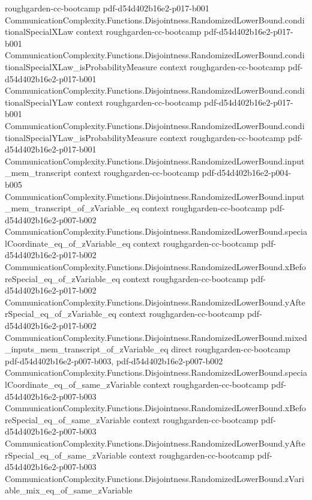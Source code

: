 \begin{theorem}
  {roughgarden-cc-bootcamp}
  {pdf-d54d402b16e2-p017-b001}
\proofstep
  {CommunicationComplexity.Functions.Disjointness.RandomizedLowerBound.conditionalSpecialXLaw}
  {context}
  {roughgarden-cc-bootcamp}
  {pdf-d54d402b16e2-p017-b001}
\proofstep
  {CommunicationComplexity.Functions.Disjointness.RandomizedLowerBound.conditionalSpecialXLaw_isProbabilityMeasure}
  {context}
  {roughgarden-cc-bootcamp}
  {pdf-d54d402b16e2-p017-b001}
\proofstep
  {CommunicationComplexity.Functions.Disjointness.RandomizedLowerBound.conditionalSpecialYLaw}
  {context}
  {roughgarden-cc-bootcamp}
  {pdf-d54d402b16e2-p017-b001}
\proofstep
  {CommunicationComplexity.Functions.Disjointness.RandomizedLowerBound.conditionalSpecialYLaw_isProbabilityMeasure}
  {context}
  {roughgarden-cc-bootcamp}
  {pdf-d54d402b16e2-p017-b001}
\proofstep
  {CommunicationComplexity.Functions.Disjointness.RandomizedLowerBound.input_mem_transcript}
  {context}
  {roughgarden-cc-bootcamp}
  {pdf-d54d402b16e2-p004-b005}
\proofstep
  {CommunicationComplexity.Functions.Disjointness.RandomizedLowerBound.input_mem_transcript_of_zVariable_eq}
  {context}
  {roughgarden-cc-bootcamp}
  {pdf-d54d402b16e2-p007-b002}
\proofstep
  {CommunicationComplexity.Functions.Disjointness.RandomizedLowerBound.specialCoordinate_eq_of_zVariable_eq}
  {context}
  {roughgarden-cc-bootcamp}
  {pdf-d54d402b16e2-p017-b002}
\proofstep
  {CommunicationComplexity.Functions.Disjointness.RandomizedLowerBound.xBeforeSpecial_eq_of_zVariable_eq}
  {context}
  {roughgarden-cc-bootcamp}
  {pdf-d54d402b16e2-p017-b002}
\proofstep
  {CommunicationComplexity.Functions.Disjointness.RandomizedLowerBound.yAfterSpecial_eq_of_zVariable_eq}
  {context}
  {roughgarden-cc-bootcamp}
  {pdf-d54d402b16e2-p017-b002}
\proofstep
  {CommunicationComplexity.Functions.Disjointness.RandomizedLowerBound.mixed_inputs_mem_transcript_of_zVariable_eq}
  {direct}
  {roughgarden-cc-bootcamp}
  {pdf-d54d402b16e2-p007-b003,
    pdf-d54d402b16e2-p007-b002}
\proofstep
  {CommunicationComplexity.Functions.Disjointness.RandomizedLowerBound.specialCoordinate_eq_of_same_zVariable}
  {context}
  {roughgarden-cc-bootcamp}
  {pdf-d54d402b16e2-p007-b003}
\proofstep
  {CommunicationComplexity.Functions.Disjointness.RandomizedLowerBound.xBeforeSpecial_eq_of_same_zVariable}
  {context}
  {roughgarden-cc-bootcamp}
  {pdf-d54d402b16e2-p007-b003}
\proofstep
  {CommunicationComplexity.Functions.Disjointness.RandomizedLowerBound.yAfterSpecial_eq_of_same_zVariable}
  {context}
  {roughgarden-cc-bootcamp}
  {pdf-d54d402b16e2-p007-b003}
\proofstep
  {CommunicationComplexity.Functions.Disjointness.RandomizedLowerBound.zVariable_mix_eq_of_same_zVariable}

\end{theorem}
